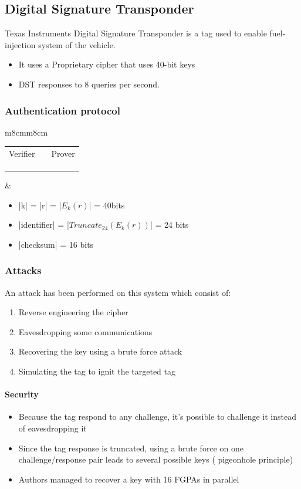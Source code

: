 \subsection{Digital Signature Transponder}

Texas Instruments Digital Signature Transponder is a tag used to enable 
fuel-injection system of the vehicle.
\begin{itemize}
	\item It uses a Proprietary cipher that uses 40-bit keys
	\item DST responses to 8 queries per second.
\end{itemize}

\subsubsection{Authentication protocol}
\begin{tabular}{m{8cm}m{8cm}}
    \begin{tabular}{ccc}
        Verifier & & Prover \\
                 &\fr{r} & \\
        \\
        & \fl{id, $Trunc_{24}(E_k(r))$, checksum} \\
    \end{tabular}
    &
    \begin{itemize}
        \item |k| = |r| = |$E_k(r)$| = 40bits
        \item |identifier| = |$Truncate_{24}(E_k(r))$| = 24 bits
        \item |checksum| = 16 bits
    \end{itemize}
\end{tabular}

\subsubsection{Attacks}
An attack has been performed on this system which consist of:
\begin{enumerate}
	\item Reverse engineering the cipher
	\item Eavesdropping some communications
	\item Recovering the key using a brute force attack
	\item Simulating the tag to ignit the targeted tag
\end{enumerate}
\paragraph{Security}
\begin{itemize}
	\item Because the tag respond to any challenge, it's possible to challenge it instead
	of eavesdropping it
	\item Since the tag response is truncated, using a brute force on one 
	challenge/response pair leads to several possible keys ( pigeonhole principle)
	\item Authors managed to recover a key with 16 FGPAs in parallel
\end{itemize}
